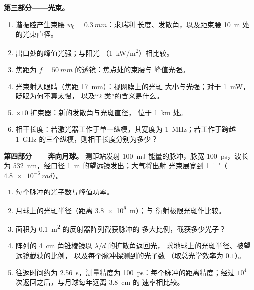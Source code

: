 \begin{problem}
\textbf{第三部分——光束。}
\begin{enumerate}[resume]
  \item 谐振腔产生束腰 $w_0 = \qty{0.3}{mm}$：求瑞利
        长度、发散角，以及距束腰 \qty{10}{m} 处的光束直径。
  \item 出口处的峰值光强；与阳光
        （\qty{1}{kW/m^2}）相比较。
  \item 焦距为 $f = \qty{50}{mm}$ 的透镜：焦点处的束腰与
        峰值光强。
  \item 光束射入眼睛（焦距 \qty{17}{mm}）：视网膜上的光斑
        大小与光强；对于 \qty{1}{mW}，眨眼为何不算太慢，
        以及“2 类”的含义是什么。
  \item $\times 10$ 扩束器：新的发散角与光斑直径，
        位于 \qty{1}{km} 处。
  \item 相干长度：若激光器工作于单一纵模，其宽度为
        \qty{1}{MHz}；若工作于跨越 \qty{1}{GHz} 的三个纵模，则相干长度分别为多少？
\end{enumerate}

\textbf{第四部分——奔向月球。}
测距站发射 \qty{100}{mJ} 能量的脉冲，脉宽 \qty{100}{ps}，波长
为 \qty{532}{nm}，经口径 \qty{1}{m} 的望远镜发出；大气将出射
光束展宽到 \qty{1}{''}（$\qty{4.8e-6}{rad}$）。
\begin{enumerate}[resume]
  \item 每个脉冲的光子数与峰值功率。
  \item 月球上的光斑半径（距离 \qty{3.8e8}{m}）；与
        衍射极限光斑作比较。
  \item 面积为 \qty{0.1}{m^2} 的反射器阵列截获脉冲的
        多大比例，截获多少光子？
  \item 阵列的 \qty{4}{cm} 角锥棱镜以 $\lambda/d$ 的扩散角返回光，
        求地球上的光斑半径、被望远镜截获的比例，
        以及每个脉冲探测到的光子数
        （取总光学效率为 $0.1$）。
  \item 往返时间约为 \qty{2.56}{s}，测量精度为
        \qty{100}{ps}：每个脉冲的距离精度；经过 $10^4$
        次返回之后，与月球每年远离 \qty{3.8}{cm} 的
        速率相比较。
\end{enumerate}
\end{problem}
